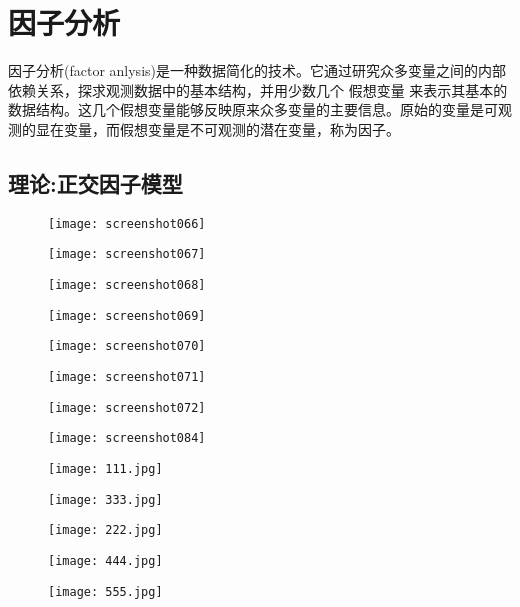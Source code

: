 \documentclass[11pt,a4paper,oneside]{book}
\begin{document}
\chapter{因子分析}
因子分析(factor anlysis)是一种数据简化的技术。它通过研究众多变量之间的内部依赖关系，探求观测数据中的基本结构，并用少数几个 假想变量 来表示其基本的数据结构。这几个假想变量能够反映原来众多变量的主要信息。原始的变量是可观测的显在变量，而假想变量是不可观测的潜在变量，称为因子。

\section{理论:正交因子模型}
\begin{figure}[H]
	\centering
	\texttt{[image: screenshot066]}
\end{figure}
\begin{figure}[H]
	\centering
	\texttt{[image: screenshot067]}
\end{figure}
\begin{figure}[H]
	\centering
	\texttt{[image: screenshot068]}
\end{figure}
\begin{figure}[H]
	\centering
	\texttt{[image: screenshot069]}
\end{figure}
\begin{figure}[H]
	\centering
	\texttt{[image: screenshot070]}
\end{figure}
\begin{figure}[H]
	\centering
	\texttt{[image: screenshot071]}
\end{figure}
\begin{figure}[H]
	\centering
	\texttt{[image: screenshot072]}
\end{figure}

\begin{figure}[H]
	\centering
	\texttt{[image: screenshot084]}
\end{figure}

\begin{figure}[H]
	\centering
	\texttt{[image: 111.jpg]}
\end{figure}
\begin{figure}[H]
	\centering
	\texttt{[image: 333.jpg]}
\end{figure}
\begin{figure}[H]
	\centering
	\texttt{[image: 222.jpg]}
\end{figure}
\begin{figure}[H]
	\centering
	\texttt{[image: 444.jpg]}
\end{figure}
\begin{figure}[H]
	\centering
	\texttt{[image: 555.jpg]}
\end{figure}
\end{document}
